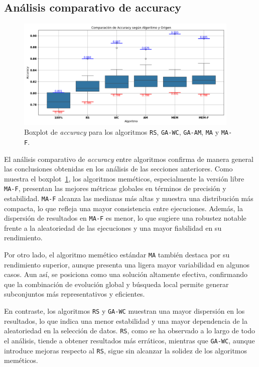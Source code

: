\subsection{Análisis comparativo de accuracy}\label{sec:comparacion-final-accuracy}
\begin{figure}[htp]
    \centering
    \includegraphics[width=0.95\textwidth]{imagenes/evaluaciones/final/boxplot-por-algoritmo}
    \caption{Boxplot de \textit{accuracy} para los algoritmos \texttt{RS}, \texttt{GA-WC}, \texttt{GA-AM}, \texttt{MA} y \texttt{MA-F}.}
    \label{fig:boxplot-comparacion-final}
\end{figure}
El análisis comparativo de \textit{accuracy} entre algoritmos confirma de manera general las conclusiones obtenidas en los análisis de las secciones anteriores.
Como muestra el boxplot~\ref{fig:boxplot-comparacion-final}, los algoritmos meméticos, especialmente la versión libre \texttt{MA-F},
presentan las mejores métricas globales en términos de precisión y estabilidad.
\texttt{MA-F} alcanza las medianas más altas y muestra una distribución más compacta, lo que refleja una mayor consistencia entre ejecuciones.
Además, la dispersión de resultados en \texttt{MA-F} es menor, lo que sugiere una robustez notable frente a la aleatoriedad de las ejecuciones y una mayor fiabilidad en su rendimiento.

Por otro lado, el algoritmo memético estándar \texttt{MA} también destaca por su rendimiento superior,
aunque presenta una ligera mayor variabilidad en algunos casos.
Aun así, se posiciona como una solución altamente efectiva,
confirmando que la combinación de evolución global y búsqueda local permite generar subconjuntos más representativos y eficientes.

En contraste, los algoritmos \texttt{RS} y \texttt{GA-WC} muestran una mayor dispersión en los resultados,
lo que indica una menor estabilidad y una mayor dependencia de la aleatoriedad en la selección de datos.
\texttt{RS}, como se ha observado a lo largo de todo el análisis, tiende a obtener resultados más erráticos, mientras que \texttt{GA-WC},
aunque introduce mejoras respecto al \texttt{RS}, sigue sin alcanzar la solidez de los algoritmos meméticos.

